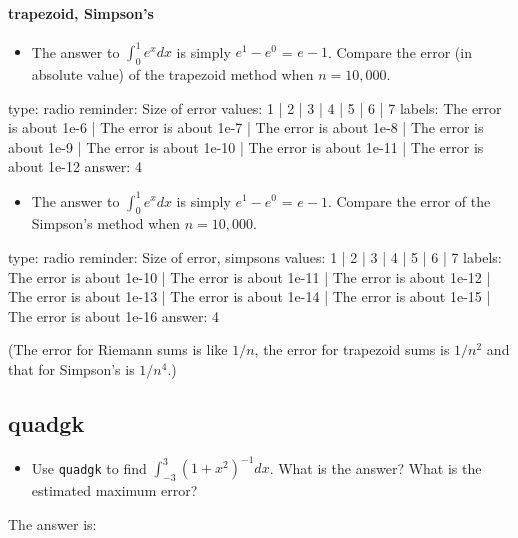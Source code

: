 \documentclass[12pt]{article}
\begin{document}
\paragraph{trapezoid, Simpson's}

\begin{itemize}
\itemsep1pt\parskip0pt
\item
  The answer to $\int_0^1 e^x dx$ is simply $e^1 - e^0$ = $e-1$. Compare
  the error (in absolute value) of the trapezoid method when $n=10,000$.
\end{itemize}

\begin{answer}
type: radio
reminder: Size of error
values: 1 | 2 | 3 | 4 | 5 | 6 | 7
labels: The error is about 1e-6 | The error is about 1e-7 | The error is about 1e-8 | The error is about 1e-9 | The error is about 1e-10 | The error is about 1e-11 | The error is about 1e-12
answer: 4
\end{answer}

\begin{itemize}
\itemsep1pt\parskip0pt
\item
  The answer to $\int_0^1 e^x dx$ is simply $e^1 - e^0$ = $e-1$. Compare
  the error of the Simpson's method when $n=10,000$.
\end{itemize}

\begin{answer}
type: radio
reminder: Size of error, simpsons
values: 1 | 2 | 3 | 4 | 5 | 6 | 7
labels: The error is about 1e-10 | The error is about 1e-11 | The error is about 1e-12 | The error is about 1e-13 | The error is about 1e-14 | The error is about 1e-15 | The error is about 1e-16
answer: 4
\end{answer}

(The error for Riemann sums is like $1/n$, the error for trapezoid sums
is $1/n^2$ and that for Simpson's is $1/n^4$.)

\subsection{quadgk}

\begin{itemize}
\itemsep1pt\parskip0pt
\item
  Use \texttt{quadgk} to find $\int_{-3}^{3} (1 + x^2)^{-1} dx$. What is
  the answer? What is the estimated maximum error?
\end{itemize}

The answer is:
\end{document}
